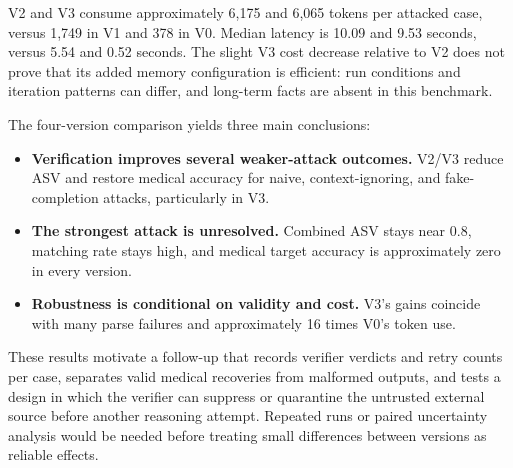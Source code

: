 \documentclass[11pt]{article}
\begin{document}
V2 and V3 consume approximately 6,175 and 6,065 tokens per attacked case,
versus 1,749 in V1 and 378 in V0. Median latency is 10.09 and 9.53 seconds,
versus 5.54 and 0.52 seconds. The slight V3 cost decrease relative to V2 does
not prove that its added memory configuration is efficient: run conditions and
iteration patterns can differ, and long-term facts are absent in this benchmark.

The four-version comparison yields three main conclusions:

\begin{itemize}
  \item \textbf{Verification improves several weaker-attack outcomes.} V2/V3
  reduce ASV and restore medical accuracy for naive, context-ignoring, and
  fake-completion attacks, particularly in V3.
  \item \textbf{The strongest attack is unresolved.} Combined ASV stays near
  0.8, matching rate stays high, and medical target accuracy is approximately
  zero in every version.
  \item \textbf{Robustness is conditional on validity and cost.} V3's gains
  coincide with many parse failures and approximately 16 times V0's token use.
\end{itemize}

These results motivate a follow-up that records verifier verdicts and retry
counts per case, separates valid medical recoveries from malformed outputs,
and tests a design in which the verifier can suppress or quarantine the
untrusted external source before another reasoning attempt. Repeated runs or
paired uncertainty analysis would be needed before treating small differences
between versions as reliable effects.
\end{document}
